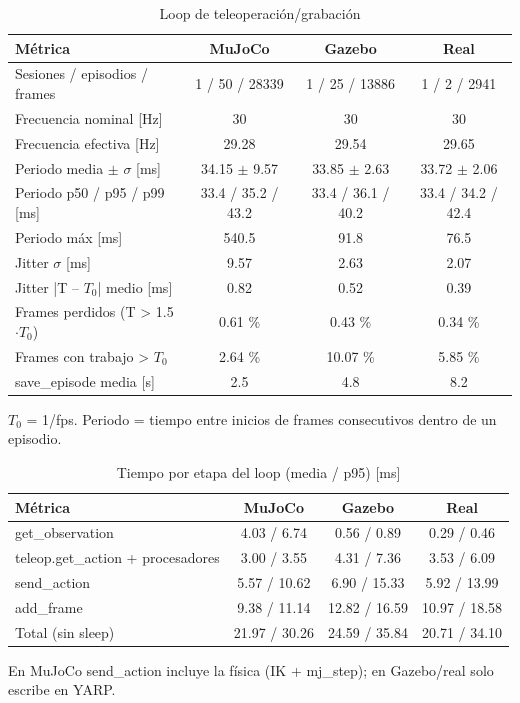
\begin{table}[htbp]
\centering\small
\caption{Loop de teleoperación/grabación}
\begin{tabular}{lccc}
\toprule
Métrica & MuJoCo & Gazebo & Real \\
\midrule
Sesiones / episodios / frames & 1 / 50 / 28339 & 1 / 25 / 13886 & 1 / 2 / 2941 \\
Frecuencia nominal [Hz] & 30 & 30 & 30 \\
Frecuencia efectiva [Hz] & 29.28 & 29.54 & 29.65 \\
Periodo media $\pm$ $\sigma$ [ms] & 34.15 $\pm$ 9.57 & 33.85 $\pm$ 2.63 & 33.72 $\pm$ 2.06 \\
Periodo p50 / p95 / p99 [ms] & 33.4 / 35.2 / 43.2 & 33.4 / 36.1 / 40.2 & 33.4 / 34.2 / 42.4 \\
Periodo máx [ms] & 540.5 & 91.8 & 76.5 \\
Jitter $\sigma$ [ms] & 9.57 & 2.63 & 2.07 \\
Jitter |T -- $T_0$| medio [ms] & 0.82 & 0.52 & 0.39 \\
Frames perdidos (T > 1.5$\cdot$$T_0$) & 0.61 \% & 0.43 \% & 0.34 \% \\
Frames con trabajo > $T_0$ & 2.64 \% & 10.07 \% & 5.85 \% \\
save\_episode media [s] & 2.5 & 4.8 & 8.2 \\
\bottomrule
\end{tabular}
\par\footnotesize $T_0$ = 1/fps. Periodo = tiempo entre inicios de frames consecutivos dentro de un episodio.
\end{table}

\begin{table}[htbp]
\centering\small
\caption{Tiempo por etapa del loop (media / p95) [ms]}
\begin{tabular}{lccc}
\toprule
Métrica & MuJoCo & Gazebo & Real \\
\midrule
get\_observation & 4.03 / 6.74 & 0.56 / 0.89 & 0.29 / 0.46 \\
teleop.get\_action + procesadores & 3.00 / 3.55 & 4.31 / 7.36 & 3.53 / 6.09 \\
send\_action & 5.57 / 10.62 & 6.90 / 15.33 & 5.92 / 13.99 \\
add\_frame & 9.38 / 11.14 & 12.82 / 16.59 & 10.97 / 18.58 \\
Total (sin sleep) & 21.97 / 30.26 & 24.59 / 35.84 & 20.71 / 34.10 \\
\bottomrule
\end{tabular}
\par\footnotesize En MuJoCo send\_action incluye la física (IK + mj\_step); en Gazebo/real solo escribe en YARP.
\end{table}

